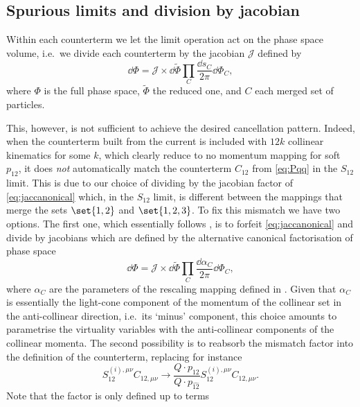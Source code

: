\documentclass[11pt,a4paper]{article}
\newcommand{\mpd}[1]{\widehat{#1}}
\begin{document}
\subsection{Spurious limits and division by jacobian}

Within each counterterm we let the limit operation
act on the phase space volume,
i.e.\ we divide each counterterm by the jacobian $\mathcal{J}$
defined by
\begin{equation}
\label{eq:jaccanonical}
	\dd{\Phi} = \mathcal{J}\times \dd{\tilde{\Phi}}
	\prod_{C} \frac{\dd{s_C}}{2\pi} \dd{\Phi_C},
\end{equation}
where $\Phi$ is the full phase space,
$\tilde{\Phi}$ the reduced one,
and $C$ each merged set of particles.

This, however, is not sufficient to achieve
the desired cancellation pattern.
Indeed, when the counterterm built from the current 
is included with $12k$ collinear kinematics for some $k$,
which clearly reduce to no momentum mapping for soft $p_{12}$,
it does \emph{not} automatically match
the counterterm $C_{12}$ from \cref{eq:Pqq} in the $S_{12}$ limit.
This is due to our choice of dividing by the jacobian factor
of \cref{eq:jaccanonical} which, in the $S_{12}$ limit,
is different between the mappings that merge
the sets $\set{1,2}$ and $\set{1,2,3}$.
To fix this mismatch we have two options.
The first one, which essentially follows \cite{Somogyi:2006da},
is to forfeit \cref{eq:jaccanonical} and divide by jacobians
which are defined by the alternative
canonical factorisation of phase space
\begin{equation}
	\dd{\Phi} = \mathcal{J}\times \dd{\tilde{\Phi}}
	\prod_{C} \frac{\dd{\alpha_C}}{2\pi} \dd{\Phi_C},
\end{equation}
where $\alpha_C$ are the parameters of the rescaling mapping
defined in \cite{Somogyi:2006da}.
Given that $\alpha_C$ is essentially the light-cone component
of the momentum of the collinear set in the anti-collinear direction,
i.e.\ its `minus' component,
this choice amounts to parametrise the virtuality variables
with the anti-collinear components of the collinear momenta.
The second possibility is to reabsorb the mismatch factor
into the definition of the counterterm, replacing for instance
\begin{equation}
	S_{12}^{(i),\mu\nu} C_{12,\mu\nu}
	\to \frac{Q\cdot p_{12}}{Q\cdot p_{\mpd{12}}}
	S_{12}^{(i),\mu\nu} C_{12,\mu\nu}.
\end{equation}
Note that the factor is only defined up to terms
\end{document}
